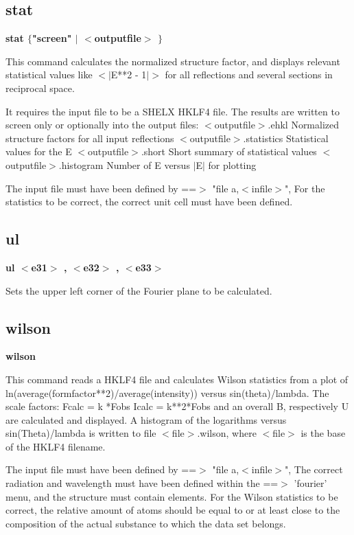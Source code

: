 \subsection*{stat}
{\bf stat $ \{$"screen" $| $ $ <$outputfile$> $ $\} $ \par }
\par
\vspace{3pt}
This command calculates the normalized structure factor, and displays 
relevant statistical values like $ <$$| $E**2 - 1$| $$> $ for all reflections and 
several sections in reciprocal space. 
\par
It requires the input file to be a SHELX HKLF4 file. 
The results are written to screen only or optionally into the 
output files: 
$ <$outputfile$> $.ehkl   Normalized structure factors for all input reflections 
$ <$outputfile$> $.statistics  Statistical values for the E 
$ <$outputfile$> $.short	    Short summary of statistical values 
$ <$outputfile$> $.histogram   Number of E versus $| $E$| $ for plotting 
\par
The input file must have been defined by ==$> $ "file a,$ <$infile$> $", 
For the statistics to be correct, the correct unit cell must have been 
defined. 
\subsection*{ul}
{\bf ul $ <$e31$> $ , $ <$e32$> $ , $ <$e33$> $ \par }
\par
\vspace{3pt}
Sets the upper left corner of the Fourier plane to be calculated. 
\subsection*{wilson}
{\bf wilson \par }
\vspace{3pt}
This command reads a HKLF4 file and calculates Wilson statistics from 
a plot of ln(average(formfactor**2)/average(intensity)) versus 
sin(theta)/lambda. 
The scale factors: Fcalc = k   *Fobs 
                   Icalc = k**2*Fobs 
and an overall B, respectively U are calculated and displayed. 
A histogram of the logarithms versus sin(Theta)/lambda is written 
to file $ <$file$> $.wilson, where $ <$file$> $ is the base of the HKLF4 filename. 
\par
The input file must have been defined by ==$> $ "file a,$ <$infile$> $", 
The correct radiation and wavelength must have been defined 
within the ==$> $ 'fourier' menu, and the structure must contain 
elements. For the Wilson statistics to be correct, the relative 
amount of atoms should be equal to or at least close to the 
composition of the actual substance to which the data set belongs. 
